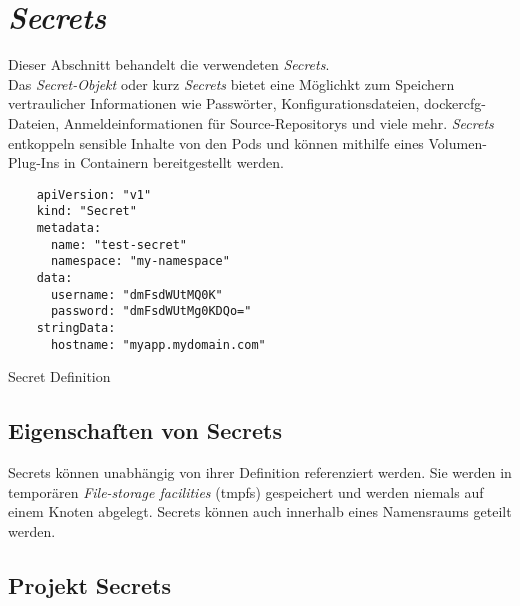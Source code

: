 \section{\emph{Secrets}}
\label{sec:buildserver-secrets}
Dieser Abschnitt behandelt die verwendeten \emph{Secrets}.\\

Das \emph{Secret-Objekt} oder kurz \emph{Secrets} bietet eine Möglichkt zum Speichern vertraulicher Informationen wie Passwörter, Konfigurationsdateien, dockercfg-Dateien, Anmeldeinformationen für Source-Repositorys und viele mehr. \emph{Secrets} entkoppeln sensible Inhalte von den Pods und können mithilfe eines Volumen-Plug-Ins in Containern bereitgestellt werden.

\begin{listing}[H]
	\centering
	\begin{verbatim}
	apiVersion: "v1"
	kind: "Secret"
	metadata:
	  name: "test-secret"
	  namespace: "my-namespace"
	data: 
	  username: "dmFsdWUtMQ0K"
	  password: "dmFsdWUtMg0KDQo="
	stringData: 
	  hostname: "myapp.mydomain.com"
	\end{verbatim}
	\caption{Secret Definition}
\end{listing}

\subsection{Eigenschaften von Secrets}

Secrets können unabhängig von ihrer Definition referenziert werden. Sie werden in temporären \emph{File-storage facilities} (tmpfs) gespeichert und werden niemals auf einem Knoten abgelegt. Secrets können auch innerhalb eines Namensraums geteilt werden.

\subsection{Projekt Secrets}